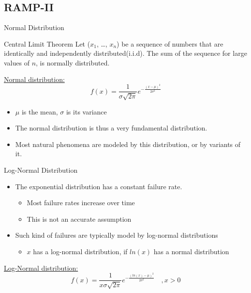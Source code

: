 \documentclass[xcolor=pdftex,dvipsnames,table,svgnames,x11names]{beamer}
\begin{document}
\subsection{RAMP-II}
\begin{frame}[shrink=5]{Normal Distribution}
 \begin{block}{Central Limit Theorem}
  Let ($x_1$, \ldots, $x_n$) be a sequence of numbers that are identically and independently distributed(i.i.d). The sum of the
sequence for large values of  $n$, is normally distributed.
 \end{block}
\textcolor{Blue3}{\underline{Normal distribution:}}
\begin{equation*}
 f(x) = \frac{1}{\sigma \sqrt{2\pi}} e^{-\frac{(x-\mu)^2}{2\sigma^2}}
\end{equation*}

\begin{itemize}
  \item $\mu$ is the mean, $\sigma$ is its variance
 \item The normal distribution is thus a very fundamental distribution. 
  \item Most natural phenomena are modeled by this distribution, or by variants of it.
\end{itemize}

\end{frame}

\begin{frame}[shrink=3]{Log-Normal Distribution}
\begin{itemize}
  \item The exponential distribution has a constant failure rate. 
      \begin{itemize}
       \item Most failure rates increase over time
	\item This is not an \textcolor{SlateBlue4}{accurate} assumption
      \end{itemize}
  \item Such kind of failures are typically model by \textcolor{Blue3}{log-normal} distributions
    \begin{itemize}
      \item $x$ has a log-normal distribution, if $ln(x)$ has a normal distribution
    \end{itemize}
\end{itemize}

\textcolor{Blue3}{\underline{Log-Normal distribution:}}
\begin{equation*}
 f(x) = \frac{1}{x\sigma \sqrt{2 \pi}} e ^ {-\frac{(ln(x) - \mu)^2}{2\sigma^2}} \quad, x>0
\end{equation*}
\end{frame}
\end{document}
